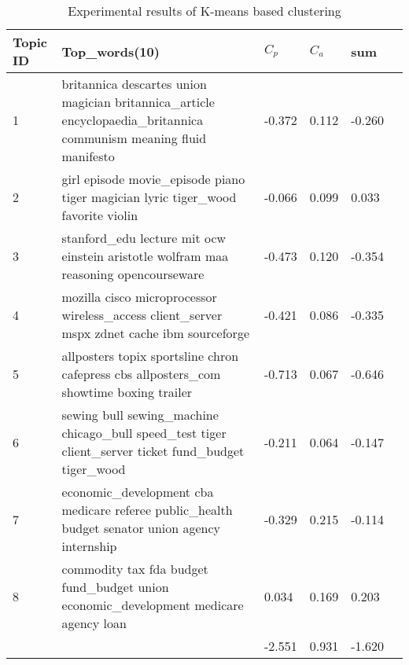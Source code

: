 \begin{table}[!htbp]
    \centering
    \hspace{0.5cm}
    \begin{tabular}{|p{45pt}|p{210pt}|p{30pt}|p{30pt}|p{30pt}|p{30pt}|}
        \hline
        Topic ID & Top\_words(10) & $C_p$ & $C_a$ & sum\\ \hline
        1 & britannica descartes union magician britannica\_article encyclopaedia\_britannica communism meaning fluid manifesto & -0.372 & 0.112 & -0.260\\\hline
        2 & girl episode movie\_episode piano tiger magician lyric tiger\_wood favorite violin & -0.066 & 0.099 & 0.033\\\hline
        3 & stanford\_edu lecture mit ocw einstein aristotle wolfram maa reasoning opencourseware & -0.473 & 0.120 & -0.354\\\hline
        4 & mozilla cisco microprocessor wireless\_access client\_server mspx zdnet cache ibm sourceforge & -0.421 & 0.086 & -0.335\\\hline
        5 & allposters topix sportsline chron cafepress cbs allposters\_com showtime boxing trailer & -0.713 & 0.067 & -0.646\\\hline
        6 & sewing bull sewing\_machine chicago\_bull speed\_test tiger client\_server ticket fund\_budget tiger\_wood & -0.211 & 0.064 & -0.147\\\hline
        7 & economic\_development cba medicare referee public\_health budget senator union agency internship & -0.329 & 0.215 & -0.114\\\hline
        8 & commodity tax fda budget fund\_budget union economic\_development medicare agency loan & 0.034 & 0.169 & 0.203\\\hline
        & & -2.551 & 0.931 & -1.620\\\hline
    \end{tabular}
    \caption{Experimental results of K-means based clustering}
    \label{tab:kmeans1}
\end{table}


